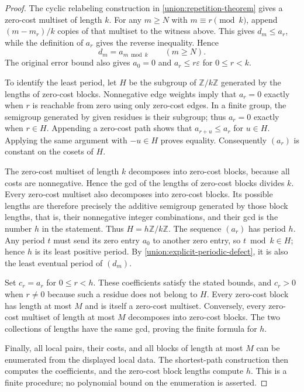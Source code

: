 \documentclass[11pt,reqno]{amsart}
\numberwithin{equation}{section}
\theoremstyle{definition}
\theoremstyle{remark}
\begin{document}
\begin{proof}
The cyclic relabeling construction in
\cref{union:repetition-theorem} gives a zero-cost multiset of length
$k$. For any $m\ge N$ with $m\equiv r\pmod k$, append
$(m-m_r)/k$ copies of that multiset to the witness above. This gives
$d_m\le a_r$, while the definition of $a_r$ gives the reverse
inequality. Hence
\begin{equation}\label{union:explicit-periodic-defect}
 d_m=a_{m\bmod k}\qquad(m\ge N).
\end{equation}
The original error bound also gives $a_0=0$ and
$a_r\le r\varepsilon$ for $0\le r<k$.

To identify the least period, let $H$ be the subgroup of
$\mathbb Z/k\mathbb Z$ generated by the lengths of zero-cost
blocks. Nonnegative edge weights imply that $a_r=0$ exactly when
$r$ is reachable from zero using only zero-cost edges. In a finite
group, the semigroup generated by given residues is their subgroup;
thus $a_r=0$ exactly when $r\in H$.
Appending a zero-cost path shows that $a_{r+u}\le a_r$ for $u\in H$.
Applying the same argument with $-u\in H$ proves equality.
Consequently $(a_r)$ is constant on the cosets of $H$.

The zero-cost multiset of length $k$ decomposes into zero-cost blocks,
because all costs are nonnegative. Hence the gcd of the lengths of
zero-cost blocks divides $k$. Every zero-cost multiset also decomposes
into zero-cost blocks. Its possible lengths are therefore precisely
the additive semigroup generated by those block lengths, that is,
their nonnegative integer combinations, and their
gcd is the number $h$ in the statement. Thus $H=h\mathbb Z/k\mathbb Z$.
The sequence $(a_r)$ has period $h$. Any period $t$ must send its
zero entry $a_0$ to another zero entry, so $t\bmod k\in H$; hence $h$ is
its least positive period. By \eqref{union:explicit-periodic-defect},
it is also the least eventual period of $(d_m)$.

Set $c_r=a_r$ for $0\le r<h$. These coefficients satisfy the stated
bounds, and $c_r>0$ when $r\ne0$ because such a residue does not
belong to $H$. Every zero-cost block has length at most $M$ and is
itself a zero-cost multiset. Conversely, every zero-cost multiset
of length at most $M$ decomposes into zero-cost blocks. The two
collections of lengths have the same gcd, proving the finite
formula for $h$.

Finally, all local pairs, their costs, and all blocks of length at
most $M$ can be enumerated from the displayed local data. The
shortest-path construction then computes the coefficients, and
the zero-cost block lengths compute $h$. This is a finite
procedure; no polynomial bound on the enumeration is asserted.
\end{proof}
\end{document}
